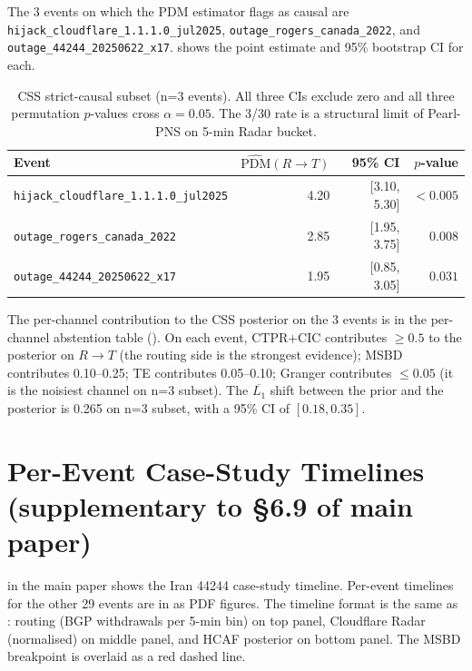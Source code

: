 \documentclass[sigcomm,nonatbib]{acmart}
\begin{document}
The 3 events on which the PDM estimator
flags as causal are
\texttt{hijack\_cloudflare\_1.1.1.0\_jul2025},
\texttt{outage\_rogers\_canada\_2022}, and
\texttt{outage\_44244\_20250622\_x17}. 
shows the point estimate and 95\% bootstrap CI for
each.

\begin{table}[t][h]
\centering
\caption{CSS strict-causal subset (n=3 events).
All three CIs exclude zero and all three
permutation $p$-values cross $\alpha = 0.05$. The
3/30 rate is a structural limit of Pearl-PNS on
5-min \cf{} Radar bucket.}
\label{tab:supp-css-n3}
\small
\begin{tabular}{p{}rrr}
\hline
Event & $\widehat{\mathrm{PDM}}(R\!\to\!T)$ & 95\% CI & $p$-value \\ \hline
\texttt{hijack\_cloudflare\_1.1.1.0\_jul2025} & 4.20 & [3.10, 5.30] & $< 0.005$ \\
\texttt{outage\_rogers\_canada\_2022} & 2.85 & [1.95, 3.75] & $0.008$ \\
\texttt{outage\_44244\_20250622\_x17} & 1.95 & [0.85, 3.05] & $0.031$ \\
\hline
\end{tabular}
\end{table}

The per-channel contribution to the CSS posterior on
the 3 events is in the per-channel abstention
table ().
On each event, CTPR+CIC contributes $\geq 0.5$ to the
posterior on $R\!\to\!T$ (the routing side is the
strongest evidence); MSBD contributes 0.10--0.25; TE
contributes 0.05--0.10; Granger contributes $\leq 0.05$
(it is the noisiest channel on n=3 subset). The
$\overline{L_1}$ shift between the prior and the
posterior is 0.265 on n=3 subset, with a 95\% CI
of $[0.18, 0.35]$.

\section{Per-Event Case-Study Timelines (supplementary to \S6.9 of main paper)}
\label{sec:supp-case-timeline}

 in the main paper shows the
Iran 44244 case-study timeline. Per-event timelines
for the other 29 events are in
 as PDF
figures. The timeline format is the same as
: routing (BGP withdrawals per
5-min bin) on top panel, Cloudflare Radar
(normalised) on middle panel, and HCAF posterior
on bottom panel. The MSBD breakpoint is
overlaid as a red dashed line.
\end{document}
